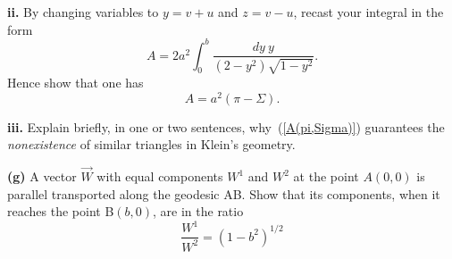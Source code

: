 \documentclass[a4paper]{article} %
\begin{document}
\pagebreak %

\begin{framed}
\textbf{ii.} By changing variables to $y=v+u$ and $z=v-u$, recast your integral in the form
\begin{equation}
A=2a^2\int^b_0 \frac{dy~y}{(2-y^2)\sqrt{1-y^2}}.
\end{equation}
Hence show that one has
\begin{equation}
A=a^2(\pi-\Sigma).\label{A(pi,Sigma)}
\end{equation}
\end{framed}

\pagebreak %

\begin{framed}
\textbf{iii.} Explain briefly, in one or two sentences, why~(\ref{A(pi,Sigma)}) guarantees the \emph{nonexistence} of similar triangles in Klein’s geometry.
\end{framed}

\pagebreak %

\begin{framed}
\textbf{(g)} A vector $\vec{W}$ with equal components $W^1$ and $W^2$ at the point $A(0,0)$ is parallel transported along the geodesic AB. Show that its components, when it reaches the point B$(b,0)$, are in the ratio
\begin{equation}
\frac{W^1}{W^2}=(1-b^2)^{1/2}
\end{equation}
\end{framed}
\end{document}
